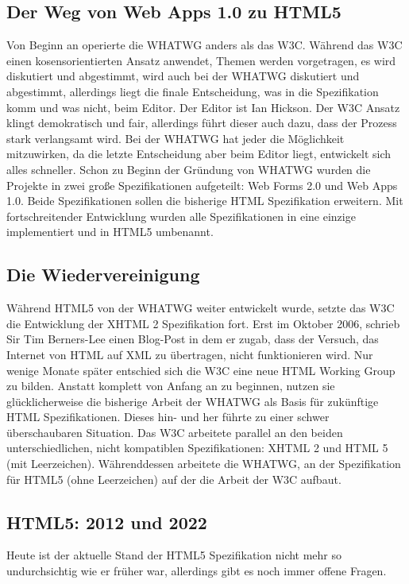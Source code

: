 \subsection{Der Weg von Web Apps 1.0 zu HTML5}
Von Beginn an operierte die WHATWG anders als das W3C. Während das W3C einen
kosensorientierten Ansatz anwendet, Themen werden vorgetragen, es wird
diskutiert und abgestimmt, wird auch bei der WHATWG diskutiert und abgestimmt,
allerdings liegt die finale Entscheidung, was in die Spezifikation komm und was
nicht, beim Editor. Der Editor ist Ian Hickson.
Der W3C Ansatz klingt demokratisch und fair, allerdings führt dieser auch dazu,
dass der Prozess stark verlangsamt wird. Bei der WHATWG hat jeder die
Möglichkeit mitzuwirken, da die letzte Entscheidung aber beim Editor liegt,
entwickelt sich alles schneller.
Schon zu Beginn der Gründung von WHATWG wurden die Projekte in zwei große
Spezifikationen aufgeteilt: Web Forms 2.0 und Web Apps 1.0. Beide
Spezifikationen sollen die bisherige HTML Spezifikation erweitern. Mit
fortschreitender Entwicklung wurden alle Spezifikationen in eine einzige
implementiert und in HTML5 umbenannt.

\subsection{Die Wiedervereinigung}
Während HTML5 von der WHATWG weiter entwickelt wurde, setzte das W3C die
Entwicklung der XHTML 2 Spezifikation fort. Erst im Oktober 2006, schrieb Sir
Tim Berners-Lee einen Blog-Post in dem er zugab, dass der Versuch, das Internet
von HTML auf XML zu übertragen, nicht funktionieren wird.
Nur wenige Monate später entschied sich die W3C eine neue HTML Working Group zu
bilden. Anstatt komplett von Anfang an zu beginnen, nutzen sie glücklicherweise
die bisherige Arbeit der WHATWG als Basis für zukünftige HTML Spezifikationen.
Dieses hin- und her führte zu einer schwer überschaubaren Situation. Das W3C
arbeitete parallel an den beiden unterschiedlichen, nicht kompatiblen
Spezifikationen: XHTML 2 und HTML 5 (mit Leerzeichen). Währenddessen arbeitete
die WHATWG, an der Spezifikation für HTML5 (ohne Leerzeichen) auf der die Arbeit
der W3C aufbaut.

\subsection{HTML5: 2012 und 2022}
Heute ist der aktuelle Stand der HTML5 Spezifikation nicht mehr so
undurchsichtig wie er früher war, allerdings gibt es noch immer offene Fragen.

